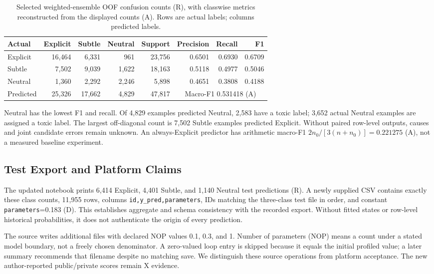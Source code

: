 \documentclass[doublecolumn]{ijcvsplatex}
\begin{document}
\begin{table}[t]
\small\centering
\caption{Selected weighted-ensemble OOF confusion counts (R), with classwise metrics reconstructed from the displayed counts (A). Rows are actual labels; columns predicted labels.}
\label{tab:confusion}
\begin{tabular}{lrrrrrrr}
\toprule
Actual & Explicit & Subtle & Neutral & Support & Precision & Recall & F1 \\
\midrule
Explicit & 16,464 & 6,331 & 961 & 23,756 & 0.6501 & 0.6930 & 0.6709 \\
Subtle & 7,502 & 9,039 & 1,622 & 18,163 & 0.5118 & 0.4977 & 0.5046 \\
Neutral & 1,360 & 2,292 & 2,246 & 5,898 & 0.4651 & 0.3808 & 0.4188 \\
\midrule
Predicted & 25,326 & 17,662 & 4,829 & 47,817 & \multicolumn{3}{c}{Macro-F1 0.531418 (A)} \\
\bottomrule
\end{tabular}
\end{table}

Neutral has the lowest F1 and recall. Of 4,829 examples predicted Neutral, 2,583 have a toxic label; 3,652 actual Neutral examples are assigned a toxic label. The largest off-diagonal count is 7,502 Subtle examples predicted Explicit. Without paired row-level outputs, causes and joint candidate errors remain unknown. An always-Explicit predictor has arithmetic macro-F1 $2n_0/[3(n+n_0)]=0.221275$ (A), not a measured baseline experiment.

\subsection{Test Export and Platform Claims}
The updated notebook prints 6,414 Explicit, 4,401 Subtle, and 1,140 Neutral test predictions (R). A newly supplied CSV contains exactly these class counts, 11,955 rows, columns \texttt{id,y\_pred,parameters}, IDs matching the three-class test file in order, and constant \texttt{parameters}=0.183 (D). This establishes aggregate and schema consistency with the recorded export. Without fitted states or row-level historical probabilities, it does not authenticate the origin of every prediction.

The source writes additional files with declared NOP values 0.1, 0.3, and 1. Number of parameters (NOP) means a count under a stated model boundary, not a freely chosen denominator. A zero-valued loop entry is skipped because it equals the initial profiled value; a later summary recommends that filename despite no matching save. We distinguish these source operations from platform acceptance. The new author-reported public/private scores remain X evidence.
\end{document}
